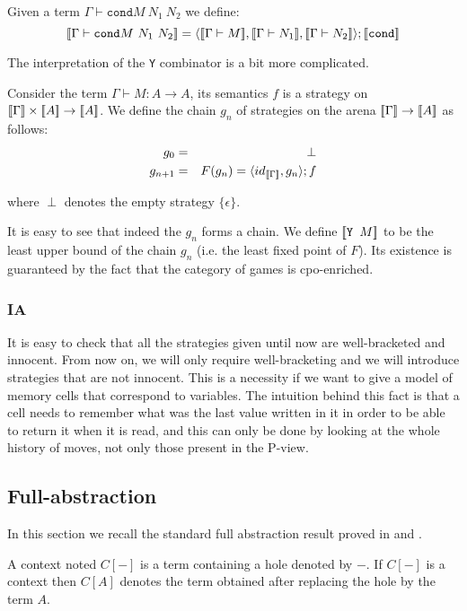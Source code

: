 Given a term $\Gamma \vdash \texttt{cond} M\ N_1\ N_2$ we define:
$$\sem{\Gamma \vdash \texttt{cond} M\ N_1\ N_2} =
\langle \sem{\Gamma \vdash M}, \sem{\Gamma \vdash N_1}, \sem{\Gamma \vdash N_2} \rangle ; \sem{\texttt{cond}}$$


The interpretation of the \texttt{Y} combinator is a bit more complicated.

Consider the term $\Gamma \vdash M : A \rightarrow A$, its semantics $f$ is a strategy on ${[\![ \Gamma ]\!]} \times {[\![A ]\!]} \rightarrow {[\![A ]\!]}$.
We define the chain $g_n$ of strategies on the arena ${[\![ \Gamma ]\!]} \rightarrow {[\![A ]\!]}$ as follows:
\begin{eqnarray*}
g_0 &=& \perp \\
g_{n+1} &=&  F(g_n) = \langle id_{{[\![ \Gamma ]\!]}}, g_n\rangle ; f
\end{eqnarray*}

where $\perp$ denotes the empty strategy $\{ \epsilon \}$.

It is easy to see that indeed the $g_n$ forms a chain.
We define ${[\![ \texttt{Y } M ]\!]}$ to be the least upper bound of the chain $g_n$
(i.e. the  least fixed point of $F$). Its existence is guaranteed by the fact that
the category of games is cpo-enriched.

\subsubsection{IA}

It is easy to check that all the strategies given until now are well-bracketed and innocent.
From now on, we will only require well-bracketing and we will introduce strategies that are
not innocent. This is a necessity if we want to give a model of memory cells that correspond
to variables. The intuition behind this fact is that a cell needs to remember what was the last value written in it
in order to be able to return it when it is read, and this can only be done by looking at the whole history of moves,
not only those present in the P-view.





\subsection{Full-abstraction}
In this section we recall the standard full abstraction result proved in  \cite{abramsky94full}
and \cite{hylandong_pcf}.

A context noted $C[-]$ is a term containing a hole denoted by $-$. If $C[-]$ is a context then $C[A]$ denotes the term obtained
after replacing the hole by the term $A$.

